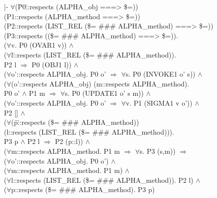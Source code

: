 \documentclass[envcountsame,runningheads]{llncs}
\begin{document}
{\tt \begin{tabbing}
|- $\forall$(\=P0\=::respects (ALPHA\_obj ===> \$=)) \\
\>\>  (P1::respects (ALPHA\_method ===> \$=)) \\
\>\>  (P2::respects (LIST\_REL (\$= \#\#\# ALPHA\_method) ===> \$=)) \\
\>\>  (P3::respects ((\$= \#\#\# ALPHA\_method) ===> \$=)). \\
\>   ($\forall$v. P0 (OVAR1 v)) $\wedge$ \\
\>   ($\forall$l\=::respects (LIST\_REL (\$= \#\#\# ALPHA\_method)). \\
\>\>    P2 l $\Rightarrow$ P0 (OBJ1 l)) $\wedge$ \\
\>   ($\forall$o'::respects ALPHA\_obj. P0 o' $\Rightarrow$ $\forall$s. P0 (INVOKE1 o' s)) $\wedge$ \\
\>   ($\forall$(o'::respects ALPHA\_obj) (m::respects ALPHA\_method). \\
\>\>    P0 o' $\wedge$ P1 m $\Rightarrow$ $\forall$s. P0 (UPDATE1 o' s m)) $\wedge$ \\
\>   ($\forall$o'::respects ALPHA\_obj. P0 o' $\Rightarrow$ $\forall$v. P1 (SIGMA1 v o')) $\wedge$ \\
\>   P2 [] $\wedge$ \\
\>   ($\forall$(\=p\=::respects (\$= \#\#\# ALPHA\_method)) \\
\>\>\>   (l::respects (LIST\_REL (\$= \#\#\# ALPHA\_method))). \\
\>\>    P3 p $\wedge$ P2 l $\Rightarrow$ P2 (p::l)) $\wedge$ \\
\>   ($\forall$m::respects ALPHA\_method. P1 m $\Rightarrow$ $\forall$s. P3 (s,m)) $\Rightarrow$ \\
\>   ($\forall$o'::respects ALPHA\_obj. P0 o') $\wedge$ \\
\>   ($\forall$m::respects ALPHA\_method. P1 m) $\wedge$ \\
\>   ($\forall$l::respects (LIST\_REL (\$= \#\#\# ALPHA\_method)). P2 l) $\wedge$ \\
\>   ($\forall$p::respects (\$= \#\#\# ALPHA\_method). P3 p)
\end{tabbing}}
\end{document}
